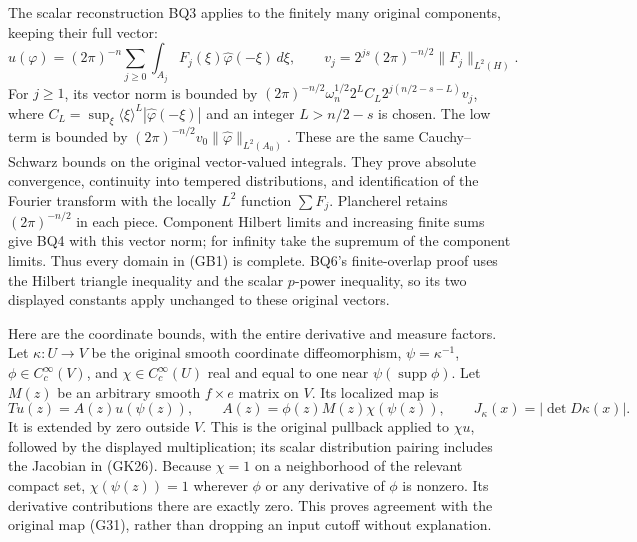 \documentclass[
  11pt,
]{article}
\begin{document}
The scalar reconstruction BQ3 applies to the finitely many original
components, keeping their full vector: \[
 u(\varphi)=(2\pi)^{-n}\sum_{j\ge0}
       \int_{A_j}F_j(\xi)\widehat\varphi(-\xi)\,d\xi,\qquad
 v_j=2^{js}(2\pi)^{-n/2}\|F_j\|_{L^2(H)}.
 \tag{GB2}
\] For \(j\ge1\), its vector norm is bounded by
\((2\pi)^{-n/2}\omega_n^{1/2}2^L C_L
2^{j(n/2-s-L)}v_j\), where
\(C_L=\sup_\xi\langle\xi\rangle^L|\widehat\varphi(-\xi)|\) and an
integer \(L>n/2-s\) is chosen. The low term is bounded by
\((2\pi)^{-n/2}v_0\|\widehat\varphi\|_{L^2(A_0)}\). These are the same
Cauchy--Schwarz bounds on the original vector-valued integrals. They
prove absolute convergence, continuity into tempered distributions, and
identification of the Fourier transform with the locally \(L^2\)
function \(\sum F_j\). Plancherel retains \((2\pi)^{-n/2}\) in each
piece. Component Hilbert limits and increasing finite sums give BQ4 with
this vector norm; for infinity take the supremum of the component
limits. Thus every domain in (GB1) is complete. BQ6's finite-overlap
proof uses the Hilbert triangle inequality and the scalar \(p\)-power
inequality, so its two displayed constants apply unchanged to these
original vectors.

Here are the coordinate bounds, with the entire derivative and measure
factors. Let \(\kappa:U\to V\) be the original smooth coordinate
diffeomorphism, \(\psi=\kappa^{-1}\), \(\phi\in C_c^\infty(V)\), and
\(\chi\in C_c^\infty(U)\) real and equal to one near
\(\psi(\operatorname{supp}\phi)\). Let \(M(z)\) be an arbitrary smooth
\(f\times e\) matrix on \(V\). Its localized map is \[
 Tu(z)=A(z)u(\psi(z)),\qquad
 A(z)=\phi(z)M(z)\chi(\psi(z)),\qquad
 J_\kappa(x)=|\det D\kappa(x)|.
 \tag{GB3}
\] It is extended by zero outside \(V\). This is the original pullback
applied to \(\chi u\), followed by the displayed multiplication; its
scalar distribution pairing includes the Jacobian in (GK26). Because
\(\chi=1\) on a neighborhood of the relevant compact set,
\(\chi(\psi(z))=1\) wherever \(\phi\) or any derivative of \(\phi\) is
nonzero. Its derivative contributions there are exactly zero. This
proves agreement with the original map (G31), rather than dropping an
input cutoff without explanation.
\end{document}
